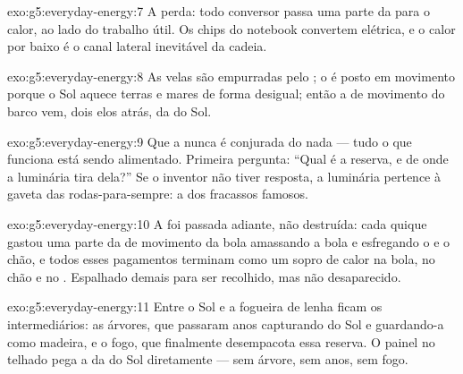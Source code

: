 \begin{solution}{exo:g5:everyday-energy:7}
A perda: todo conversor passa uma parte da  para o calor, ao
lado do trabalho útil. Os chips do notebook convertem 
elétrica, e o calor por baixo é o canal lateral inevitável da cadeia.
\end{solution}

\begin{solution}{exo:g5:everyday-energy:8}
As velas são empurradas pelo ; o  é  posto em movimento
porque o Sol aquece terras e mares de forma desigual; então a 
de movimento do barco vem, dois elos atrás, da  do Sol.
\end{solution}

\begin{solution}{exo:g5:everyday-energy:9}
Que a  nunca é conjurada do nada --- tudo o que funciona está
sendo alimentado. Primeira pergunta: ``Qual é a reserva, e de onde a
luminária tira  dela?'' Se o inventor não tiver resposta, a
luminária pertence à gaveta das rodas-para-sempre: a dos fracassos
famosos.
\end{solution}

\begin{solution}{exo:g5:everyday-energy:10}
A  foi passada adiante, não destruída: cada quique gastou uma
parte da  de movimento da bola amassando a bola e esfregando o
 e o chão, e todos esses pagamentos terminam como um sopro de calor
na bola, no chão e no . Espalhado demais para ser recolhido, mas
não desaparecido.
\end{solution}

\begin{solution}{exo:g5:everyday-energy:11}
Entre o Sol e a fogueira de lenha ficam os intermediários: as
árvores, que passaram anos capturando  do Sol e guardando-a como
madeira, e o fogo, que finalmente desempacota essa reserva. O painel
no telhado pega a  da  do Sol diretamente --- sem árvore,
sem anos, sem fogo.
\end{solution}
